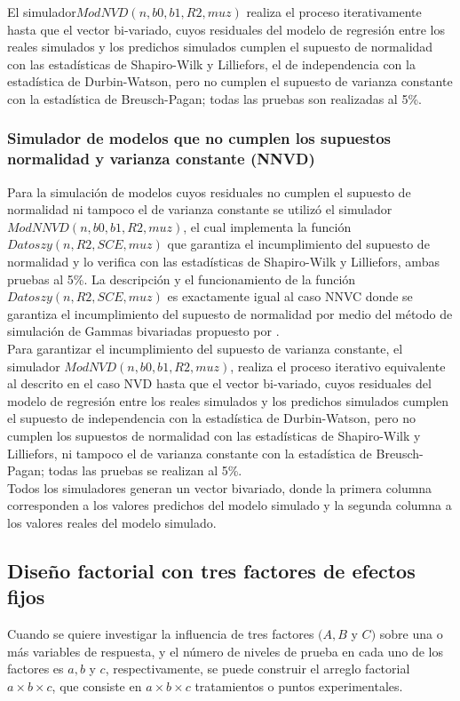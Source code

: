 El simulador$ ModNVD(n,b0,b1,R2,muz)$ realiza el proceso iterativamente hasta que el vector bi-variado, cuyos residuales del modelo de regresión entre los reales simulados y los predichos simulados cumplen el supuesto de normalidad con las estadísticas de Shapiro-Wilk y Lilliefors, el de independencia con la estadística de Durbin-Watson, pero no cumplen el supuesto de varianza constante con la estadística de Breusch-Pagan; todas las pruebas son realizadas al 5\%. 

\subsubsection{Simulador de modelos que no cumplen los supuestos normalidad y varianza constante (NNVD)}

Para la simulación de modelos cuyos residuales no cumplen el supuesto de normalidad ni tampoco el de varianza constante se utilizó el simulador $ModNNVD(n,b0,b1,R2,muz)$, el cual implementa la función $Datoszy(n,R2,SCE,muz)$ que garantiza el incumplimiento del supuesto de normalidad y lo verifica con las estadísticas de Shapiro-Wilk y Lilliefors, ambas pruebas al 5\%. La descripción y el funcionamiento de la función $Datoszy(n,R2,SCE,muz)$ es exactamente igual al caso NNVC donde se garantiza el incumplimiento del supuesto de normalidad por medio del método de simulación de Gammas bivariadas propuesto por \textcite{cheng-2011}.\\


Para garantizar el incumplimiento del supuesto de varianza constante, el simulador $ModNVD(n,b0,b1,R2,muz)$, realiza el proceso iterativo equivalente al descrito en el caso NVD hasta que el vector bi-variado, cuyos residuales del modelo de regresión entre los reales simulados y los predichos simulados cumplen el supuesto de independencia con la estadística de Durbin-Watson, pero no cumplen los supuestos de normalidad con las estadísticas de Shapiro-Wilk y Lilliefors, ni tampoco el de varianza constante con la estadística de Breusch-Pagan; todas las pruebas se realizan al 5\%.\\ 


Todos los simuladores generan un vector bivariado, donde la primera columna corresponden a los valores predichos del modelo simulado y la segunda columna a los valores reales del modelo simulado.\\




\subsection{Diseño factorial con tres factores de efectos fijos}
Cuando se quiere investigar la influencia de tres factores $(A, B$ y $C)$ sobre una o más variables de respuesta, y el número de niveles de prueba en cada uno de los factores es $a, b$ y $c$, respectivamente, se puede construir el arreglo factorial $a \times b \times c$, que consiste en $a \times b \times c$ tratamientos o puntos experimentales.\\



